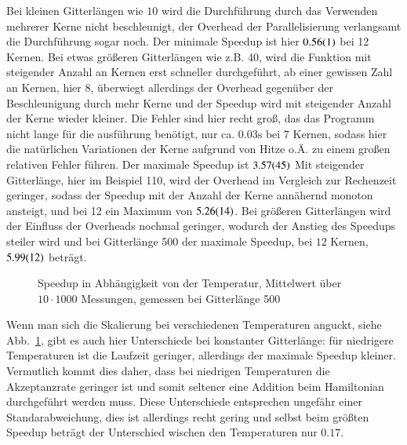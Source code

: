 	Bei kleinen Gitterlängen wie $10$ wird die Durchführung durch das Verwenden mehrerer Kerne nicht beschleunigt, der Overhead der Parallelisierung verlangsamt die Durchführung sogar noch. Der minimale Speedup ist hier $\num{0,56\pm0,01}$ bei 12 Kernen. Bei etwas größeren Gitterlängen wie z.{}B.{} 40, wird die Funktion mit steigender Anzahl an Kernen erst schneller durchgeführt, ab einer gewissen Zahl an Kernen, hier $8$, überwiegt allerdings der Overhead gegenüber der Beschleunigung durch mehr Kerne und der Speedup wird mit steigender Anzahl der Kerne wieder kleiner. Die Fehler sind hier recht groß, das das Programm nicht lange für die ausführung benötigt, nur ca.{} $\num{0,03}\si{\second}$ bei 7 Kernen, sodass hier die natürlichen Variationen der Kerne aufgrund von Hitze o.{}Ä.{} zu einem großen relativen Fehler führen. Der maximale Speedup ist $\num{3,57\pm0,45}$ Mit steigender Gitterlänge, hier im Beispiel 110, wird der Overhead im Vergleich zur Rechenzeit geringer, sodass der Speedup mit der Anzahl der Kerne annähernd monoton ansteigt, und bei 12 ein Maximum von $\num{5,26\pm0,14}$.
	Bei größeren Gitterlängen wird der Einfluss der Overheads nochmal geringer, wodurch der Anstieg des Speedups steiler wird und bei Gitterlänge 500 der maximale Speedup, bei $12$ Kernen, $\num{5,99\pm0,12}$ beträgt.
 	
	
	\begin{figure}[htbp]
		
		\caption[Speedup in Abhängigkeit von der Temperatur]{Speedup in Abhängigkeit von der Temperatur, Mittelwert über $10 \cdot 1000$ Messungen, gemessen bei Gitterlänge 500}
		\label{fig:skalierungtemp}
	\end{figure}
		
	Wenn man sich die Skalierung bei verschiedenen Temperaturen anguckt, siehe Abb.~\ref{fig:skalierungtemp}, gibt es auch hier Unterschiede bei konstanter Gitterlänge: für niedrigere Temperaturen ist die Laufzeit geringer, allerdings der maximale Speedup kleiner. Vermutlich kommt dies daher, dass bei niedrigen Temperaturen die Akzeptanzrate geringer ist und somit seltener eine Addition beim Hamiltonian durchgeführt werden muss. Diese Unterschiede entsprechen ungefähr einer Standarabweichung, dies ist allerdings recht gering und selbst beim größten Speedup beträgt der Unterschied wischen den Temperaturen nur $\num{0,17}$.
	
